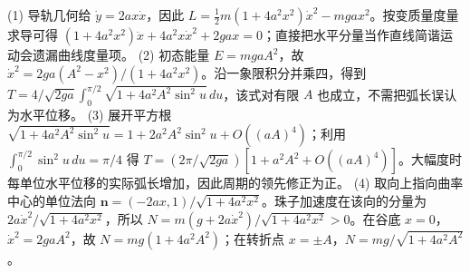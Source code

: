 (1) 导轨几何给 \(\dot y=2ax\dot x\)，因此 \(L=\frac12m(1+4a^2x^2)\dot x^2-mga x^2\)。按变质量度量求导可得 \((1+4a^2x^2)\ddot x+4a^2x\dot x^2+2ga x=0\)；直接把水平分量当作直线简谐运动会遗漏曲线度量项。
(2) 初态能量 \(E=mgaA^2\)，故 \(\dot x^2=2ga(A^2-x^2)/(1+4a^2x^2)\)。沿一象限积分并乘四，得到 \(T=4/\sqrt{2ga}\int_0^{\pi/2}\sqrt{1+4a^2A^2\sin^2u}\,du\)，该式对有限 \(A\) 也成立，不需把弧长误认为水平位移。
(3) 展开平方根 \(\sqrt{1+4a^2A^2\sin^2u}=1+2a^2A^2\sin^2u+O((aA)^4)\)；利用 \(\int_0^{\pi/2}\sin^2u\,du=\pi/4\) 得 \(T=(2\pi/\sqrt{2ga})[1+a^2A^2+O((aA)^4)]\)。大幅度时每单位水平位移的实际弧长增加，因此周期的领先修正为正。
(4) 取向上指向曲率中心的单位法向 \(\mathbf n=(-2ax,1)/\sqrt{1+4a^2x^2}\)。珠子加速度在该向的分量为 \(2a\dot x^2/\sqrt{1+4a^2x^2}\)，所以 \(N=m(g+2a\dot x^2)/\sqrt{1+4a^2x^2}>0\)。在谷底 \(x=0\)，\(\dot x^2=2gaA^2\)，故 \(N=mg(1+4a^2A^2)\)；在转折点 \(x=\pm A\)，\(N=mg/\sqrt{1+4a^2A^2}\)。
